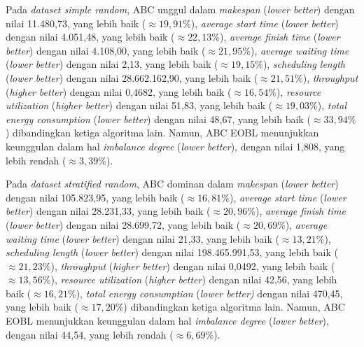 Pada \textit{dataset simple random}, ABC unggul dalam \textit{makespan} (\textit{lower better}) dengan nilai 11.480,73, yang lebih baik ($\approx 19,91\%$), \textit{average start time} (\textit{lower better}) dengan nilai 4.051,48, yang lebih baik ($\approx 22,13\%$), \textit{average finish time} (\textit{lower better}) dengan nilai 4.108,00, yang lebih baik ($\approx 21,95\%$), \textit{average waiting time} (\textit{lower better}) dengan nilai 2,13, yang lebih baik ($\approx 19,15\%$), \textit{scheduling length} (\textit{lower better}) dengan nilai 28.662.162,90, yang lebih baik ($\approx 21,51\%$), \textit{throughput} (\textit{higher better}) dengan nilai 0,4682, yang lebih baik ($\approx 16,54\%$), \textit{resource utilization} (\textit{higher better}) dengan nilai 51,83, yang lebih baik ($\approx 19,03\%$), \textit{total energy consumption} (\textit{lower better}) dengan nilai 48,67, yang lebih baik ($\approx 33,94\%$) dibandingkan ketiga algoritma lain. Namun, ABC EOBL menunjukkan keunggulan dalam hal \textit{imbalance degree} (\textit{lower better}), dengan nilai 1,808, yang lebih rendah ($\approx 3,39\%$).

Pada \textit{dataset stratified random}, ABC dominan dalam \textit{makespan} (\textit{lower better}) dengan nilai 105.823,95, yang lebih baik ($\approx 16,81\%$), \textit{average start time} (\textit{lower better}) dengan nilai 28.231,33, yang lebih baik ($\approx 20,96\%$), \textit{average finish time} (\textit{lower better}) dengan nilai 28.699,72, yang lebih baik ($\approx 20,69\%$), \textit{average waiting time} (\textit{lower better}) dengan nilai 21,33, yang lebih baik ($\approx 13,21\%$), \textit{scheduling length} (\textit{lower better}) dengan nilai 198.465.991,53, yang lebih baik ($\approx 21,23\%$), \textit{throughput} (\textit{higher better}) dengan nilai 0,0492, yang lebih baik ($\approx 13,56\%$), \textit{resource utilization} (\textit{higher better}) dengan nilai 42,56, yang lebih baik ($\approx 16,21\%$), \textit{total energy consumption} (\textit{lower better)} dengan nilai 470,45, yang lebih baik ($\approx 17,20\%$) dibandingkan ketiga algoritma lain. Namun, ABC EOBL menunjukkan keunggulan dalam hal \textit{imbalance degree} (\textit{lower better}), dengan nilai 44,54, yang lebih rendah ($\approx 6,69\%$).

